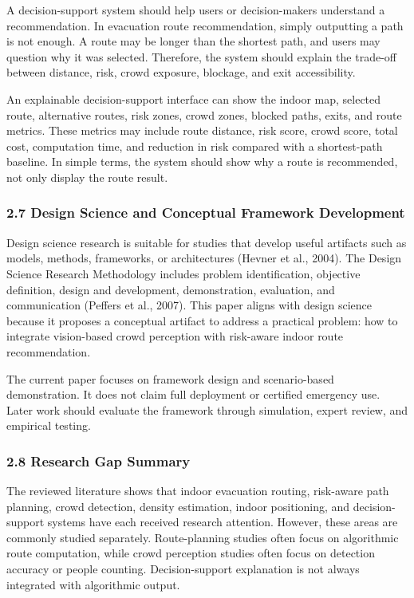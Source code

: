 \documentclass[
]{article}
\begin{document}
A decision-support system should help users or decision-makers
understand a recommendation. In evacuation route recommendation, simply
outputting a path is not enough. A route may be longer than the shortest
path, and users may question why it was selected. Therefore, the system
should explain the trade-off between distance, risk, crowd exposure,
blockage, and exit accessibility.

An explainable decision-support interface can show the indoor map,
selected route, alternative routes, risk zones, crowd zones, blocked
paths, exits, and route metrics. These metrics may include route
distance, risk score, crowd score, total cost, computation time, and
reduction in risk compared with a shortest-path baseline. In simple
terms, the system should show why a route is recommended, not only
display the route result.

\subsubsection{2.7 Design Science and Conceptual Framework
Development}\label{design-science-and-conceptual-framework-development}

Design science research is suitable for studies that develop useful
artifacts such as models, methods, frameworks, or architectures (Hevner
et al., 2004). The Design Science Research Methodology includes problem
identification, objective definition, design and development,
demonstration, evaluation, and communication (Peffers et al., 2007).
This paper aligns with design science because it proposes a conceptual
artifact to address a practical problem: how to integrate vision-based
crowd perception with risk-aware indoor route recommendation.

The current paper focuses on framework design and scenario-based
demonstration. It does not claim full deployment or certified emergency
use. Later work should evaluate the framework through simulation, expert
review, and empirical testing.

\subsubsection{2.8 Research Gap Summary}\label{research-gap-summary}

The reviewed literature shows that indoor evacuation routing, risk-aware
path planning, crowd detection, density estimation, indoor positioning,
and decision-support systems have each received research attention.
However, these areas are commonly studied separately. Route-planning
studies often focus on algorithmic route computation, while crowd
perception studies often focus on detection accuracy or people counting.
Decision-support explanation is not always integrated with algorithmic
output.
\end{document}
